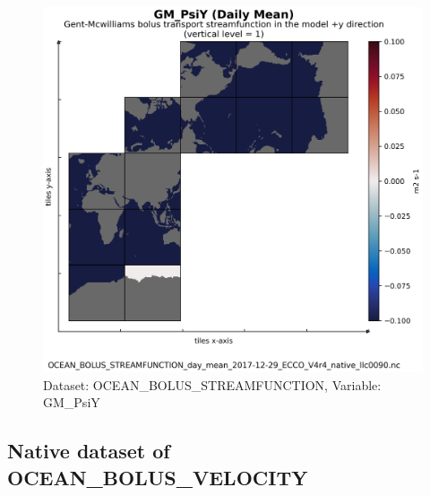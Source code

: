 \begin{figure}[H]
\centering
\includegraphics[scale=0.55]{../images/plots/native_plots/Gent-McWilliams_Bolus_Transport_Streamfunction/GM_PsiY.png}
\caption{Dataset: OCEAN\_BOLUS\_STREAMFUNCTION, Variable: GM\_PsiY}
\label{tab:table-OCEAN_BOLUS_STREAMFUNCTION_GM_PsiY-Plot}
\end{figure}
\newpage
\subsection{Native dataset of OCEAN\_BOLUS\_VELOCITY}
\newp
